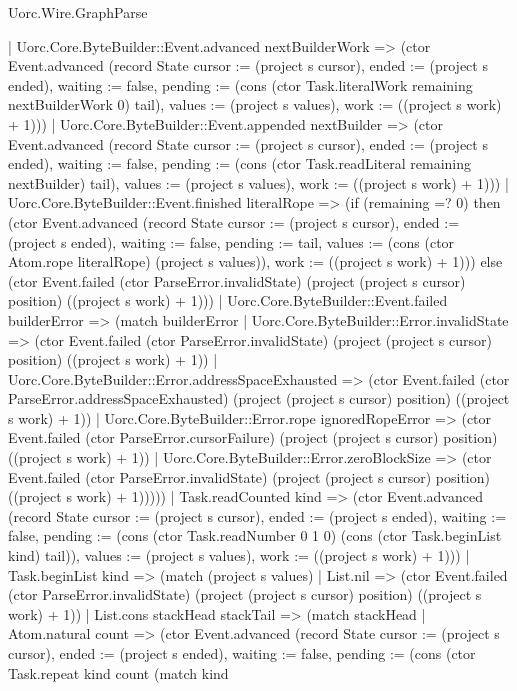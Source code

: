 \begin{lexlean}{Uorc.Wire.GraphParse}
\begin{semanticmodule}
{        | Uorc.Core.ByteBuilder::Event.advanced nextBuilderWork => (ctor Event.advanced (record State {cursor := (project s cursor), ended := (project s ended), waiting := false, pending := (cons (ctor Task.literalWork remaining nextBuilderWork 0) tail), values := (project s values), work := ((project s work) + 1)}))
        | Uorc.Core.ByteBuilder::Event.appended nextBuilder => (ctor Event.advanced (record State {cursor := (project s cursor), ended := (project s ended), waiting := false, pending := (cons (ctor Task.readLiteral remaining nextBuilder) tail), values := (project s values), work := ((project s work) + 1)}))
        | Uorc.Core.ByteBuilder::Event.finished literalRope => (if (remaining =? 0) then (ctor Event.advanced (record State {cursor := (project s cursor), ended := (project s ended), waiting := false, pending := tail, values := (cons (ctor Atom.rope literalRope) (project s values)), work := ((project s work) + 1)})) else (ctor Event.failed (ctor ParseError.invalidState) (project (project s cursor) position) ((project s work) + 1)))
        | Uorc.Core.ByteBuilder::Event.failed builderError => (match builderError
          | Uorc.Core.ByteBuilder::Error.invalidState => (ctor Event.failed (ctor ParseError.invalidState) (project (project s cursor) position) ((project s work) + 1))
          | Uorc.Core.ByteBuilder::Error.addressSpaceExhausted => (ctor Event.failed (ctor ParseError.addressSpaceExhausted) (project (project s cursor) position) ((project s work) + 1))
          | Uorc.Core.ByteBuilder::Error.rope ignoredRopeError => (ctor Event.failed (ctor ParseError.cursorFailure) (project (project s cursor) position) ((project s work) + 1))
          | Uorc.Core.ByteBuilder::Error.zeroBlockSize => (ctor Event.failed (ctor ParseError.invalidState) (project (project s cursor) position) ((project s work) + 1)))))
      | Task.readCounted kind => (ctor Event.advanced (record State {cursor := (project s cursor), ended := (project s ended), waiting := false, pending := (cons (ctor Task.readNumber 0 1 0) (cons (ctor Task.beginList kind) tail)), values := (project s values), work := ((project s work) + 1)}))
      | Task.beginList kind => (match (project s values)
        | List.nil => (ctor Event.failed (ctor ParseError.invalidState) (project (project s cursor) position) ((project s work) + 1))
        | List.cons stackHead stackTail => (match stackHead
          | Atom.natural count => (ctor Event.advanced (record State {cursor := (project s cursor), ended := (project s ended), waiting := false, pending := (cons (ctor Task.repeat kind count (match kind
}}
\end{semanticmodule}
\end{lexlean}
